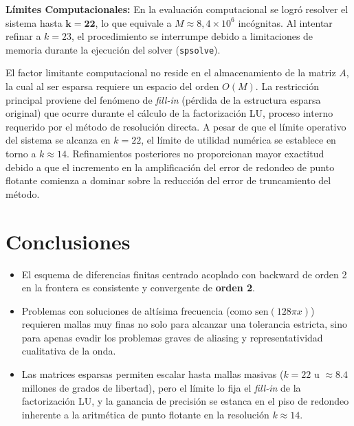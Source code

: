 \documentclass[]{report}
\begin{document}
\textbf{Límites Computacionales:} En la evaluación computacional se logró resolver el sistema hasta $\mathbf{k=22}$, lo que equivale a $M\approx8{,}4\times10^6$ incógnitas. Al intentar refinar a $k=23$, el procedimiento se interrumpe debido a limitaciones de memoria durante la ejecución del solver (\texttt{spsolve}).

El factor limitante computacional no reside en el almacenamiento de la matriz $A$, la cual al ser esparsa requiere un espacio del orden $O(M)$. La restricción principal proviene del fenómeno de \emph{fill-in} (pérdida de la estructura esparsa original) que ocurre durante el cálculo de la factorización LU, proceso interno requerido por el método de resolución directa. A pesar de que el límite operativo del sistema se alcanza en $k=22$, el límite de utilidad numérica se establece en torno a $k \approx 14$. Refinamientos posteriores no proporcionan mayor exactitud debido a que el incremento en la amplificación del error de redondeo de punto flotante comienza a dominar sobre la reducción del error de truncamiento del método.

\section*{Conclusiones}

\begin{itemize}
  \item El esquema de diferencias finitas centrado acoplado con backward de orden 2 en la frontera es consistente y convergente de \textbf{orden 2}.
  \item Problemas con soluciones de altísima frecuencia (como $\text{sen}(128\pi x)$) requieren mallas muy finas no solo para alcanzar una tolerancia estricta, sino para apenas evadir los problemas graves de aliasing y representatividad cualitativa de la onda.
  \item Las matrices esparsas permiten escalar hasta mallas masivas ($k=22$ u $\approx 8.4$ millones de grados de libertad), pero el límite lo fija el \emph{fill-in} de la factorización LU, y la ganancia de precisión se estanca en el piso de redondeo inherente a la aritmética de punto flotante en la resolución $k \approx 14$.
\end{itemize}
\end{document}
